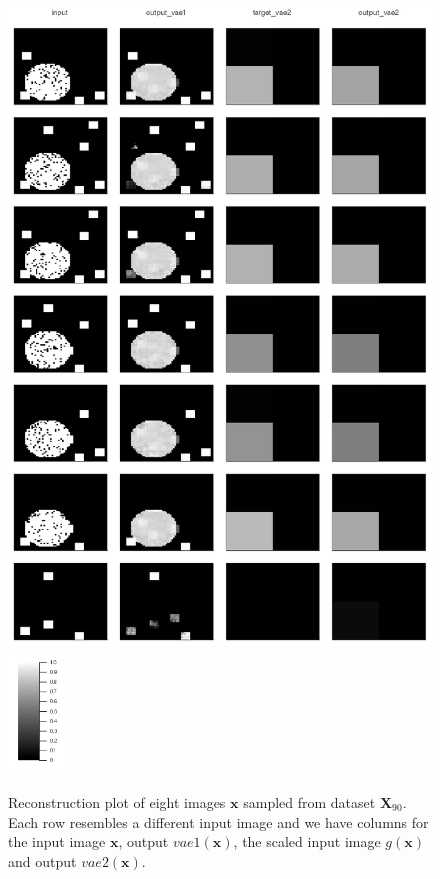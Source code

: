 \documentclass[12pt]{report}
\theoremstyle{definition}
\begin{document}
 

\begin{figure}
\begin{center}
  \includegraphics[width=11.5cm]{../code/plots/reconstruction1.png} 		  \includegraphics[width=1.5cm]{../code/plots/scale.png}
  \caption{Reconstruction plot of eight images $\mathbf{x}$ sampled from dataset $\mathbf{X}_{90}$. Each row resembles a different input image and we have columns for the input image $\mathbf{x}$, output $vae1(\mathbf{x})$, the scaled input image $g(\mathbf{x})$ and output $vae2(\mathbf{x})$.}
  \label{fig:recon1}
\end{center}
\end{figure}
\end{document}
